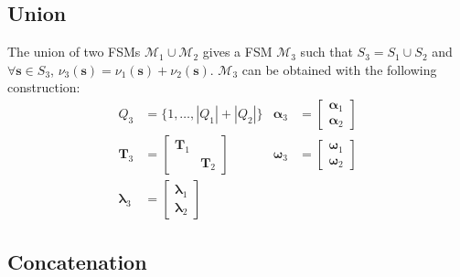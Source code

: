 \subsection{Union}

The union of two FSMs $\mathcal{M}_1 \cup \mathcal{M}_2$ gives a FSM
$\mathcal{M}_3$ such that $S_3 = S_1 \cup S_2$ and
$\forall \mathbf{s} \in S_3$, $\nu_3(\mathbf{s}) =
\nu_1(\mathbf{s}) + \nu_2(\mathbf{s})$.
$\mathcal{M}_3$ can be obtained with the following construction:
\begin{align}
    Q_3 &= \{1, \dots, |Q_1| + |Q_2| \} &
    \boldsymbol{\alpha}_3 &= \begin{bmatrix}
        \boldsymbol{\alpha}_1 \\
        \boldsymbol{\alpha}_2
    \end{bmatrix} \\
    \mathbf{T}_3 &= \begin{bmatrix}
        \mathbf{T}_1 & \\
        & \mathbf{T}_2
    \end{bmatrix} &
    \boldsymbol{\omega}_3 &= \begin{bmatrix}
        \boldsymbol{\omega}_1 \\
        \boldsymbol{\omega}_2
    \end{bmatrix} \\
    \boldsymbol{\lambda}_3 &= \begin{bmatrix}
        \boldsymbol{\lambda}_1 \\
        \boldsymbol{\lambda}_2
    \end{bmatrix} & &
\end{align}

\subsection{Concatenation}

